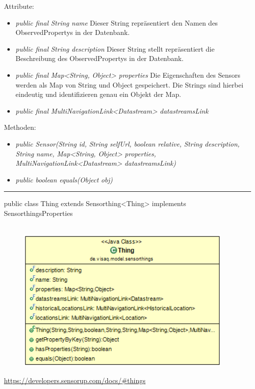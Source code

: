 Attribute:
\begin{itemize}
    \item \emph{public final String name} Dieser String repräsentiert den Namen des ObservedPropertys in der Datenbank.
    \item \emph{public final String description} Dieser String stellt repräsentiert die Beschreibung des ObservedPropertys in der Datenbank.
    \item \emph{public final Map<String, Object> properties} Die Eigenschaften des Sensors werden als Map von String und Object gespeichert. Die Strings sind hierbei eindeutig und identifizieren genau ein Objekt der Map.
    \item \emph{public final MultiNavigationLink<Datastream> datastreamsLink} 
\end{itemize}
Methoden:
\begin{itemize}
    \item \emph{public Sensor(String id, String selfUrl, boolean relative, String description, String name, Map<String, Object> properties, MultiNavigationLink<Datastream> datastreamsLink)}
    \item \emph{public boolean equals(Object obj)} 
\end{itemize}

\rule{\textwidth}{0.4pt}
public class Thing extends Sensorthing<Thing> implements SensorthingsProperties
\\\\
\begin{minipage}{0.4\textwidth}
    \begin{figure}[H]
        {\centering\includegraphics[width=0.95\textwidth]{media/backend/modell/classes/Thing.png}}
    \end{figure}
    \end{minipage} \hfill
\begin{minipage}{0.6\textwidth}
    \url{https://developers.sensorup.com/docs/#things}
\end{minipage}

